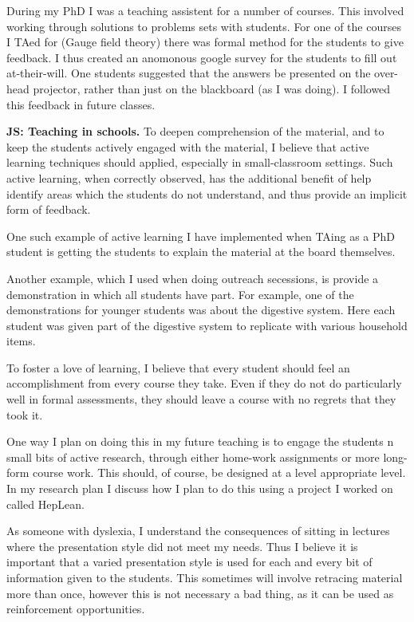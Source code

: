 \documentclass[12pt,letter]{article}
\newcommand{\js}[1]{{\leavevmode\color{magenta}\bf  JS: #1}}
\newcounter{customtitle}
\begin{document}
 During my PhD I was a teaching assistent for a number of courses. This involved working through solutions to problems sets with students. For one of the courses I TAed for (Gauge field theory) there was formal method for the students to give feedback. I thus created an anomonous google survey for the students to fill out at-their-will. One students suggested that the answers be presented on the over-head projector, rather than just on the blackboard (as I was doing). I followed this feedback in future classes.
 
  
  \js{Teaching in schools. }
 To deepen comprehension of the material, and to keep the students actively   engaged with the material, I believe that active learning techniques should applied, especially in small-classroom
settings. Such active learning, when correctly observed, has the additional benefit of help identify areas which the students 
do not understand, and thus provide an implicit form of feedback.

One such example of active learning I have implemented when TAing as a PhD student is getting the students to explain the material at the board themselves. 

Another example, which I used when doing outreach secessions, is provide a demonstration in which all students have part. For example, one of the demonstrations for younger students was about the digestive system. Here each student was given part of the  digestive system to replicate with various household items.  

  
 To foster a love of learning, 
  I believe that every student should
  feel an accomplishment from every course they take. Even if they do not do particularly well in formal assessments, they should leave a course with no regrets that they took it. 
  
  One way I plan on doing this in my future teaching is to  engage the students n small bits of active research, through either 
home-work assignments or more long-form course work. This should, of course, 
be designed at a level appropriate level. In my research plan I discuss how I plan to do this using a project I worked on called HepLean. 

 
 As someone with dyslexia, I understand
 the consequences of sitting in lectures  where the presentation 
style did not meet my needs. Thus I believe it is important that a varied presentation 
style is used for each and every bit of information given to the students. 
This sometimes will involve retracing material more than once, however this 
is not necessary a bad thing, as it can be used as reinforcement opportunities. 
\end{document}

